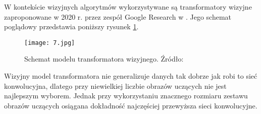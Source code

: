 W kontekście wizyjnych algorytmów wykorzystywane są transformatory wizyjne zaproponowane w 2020 r. przez zespół Google Research w \cite{dosovitskiy2020}. Jego schemat poglądowy przedstawia poniższy rysunek \ref{fig:schemat-vit}.
\begin{figure}[H]
    \centering
    \texttt{[image: 7.jpg]}
    \caption{Schemat modelu transformatora wizyjnego. Źródło: \cite{dosovitskiy2020}}
    \label{fig:schemat-vit}
\end{figure}
Wizyjny model transformatora nie generalizuje danych tak dobrze jak robi to sieć konwolucyjna, dlatego przy niewielkiej liczbie obrazów uczących nie jest najlepszym wyborem. Jednak przy wykorzystaniu znacznego rozmiaru zestawu obrazów uczących osiągana dokładność najczęściej przewyższa sieci konwolucyjne.